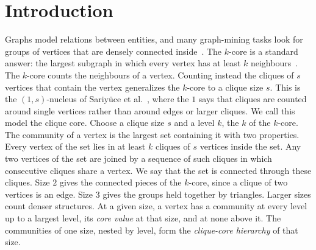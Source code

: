 \section{Introduction}\label{sec:intro}

Graphs model relations between entities, and many graph-mining tasks look for groups of vertices that are densely connected inside~\cite{leskovec2016snap,fortunato2010community,Fang2020Survey}.
%
The $k$-core is a standard answer: the largest subgraph in which every vertex has at least $k$ neighbours~\cite{seidman1983network}.
%
The $k$-core counts the neighbours of a vertex.
%
Counting instead the cliques of $s$ vertices that contain the vertex generalizes the $k$-core to a clique size $s$.
%
This is the $(1,s)$-nucleus of Sariy\"uce et al.~\cite{firstNucleus}, where the $1$ says that cliques are counted around single vertices rather than around edges or larger cliques.
%
We call this model the clique core.
%
Choose a clique size $s$ and a level $k$, the $k$ of the $k$-core.
%
The community of a vertex is the largest set containing it with two properties.
%
Every vertex of the set lies in at least $k$ cliques of $s$ vertices inside the set.
%
Any two vertices of the set are joined by a sequence of such cliques in which consecutive cliques share a vertex.
%
We say that the set is connected through these cliques.
%
Size $2$ gives the connected pieces of the $k$-core, since a clique of two vertices is an edge.
%
Size $3$ gives the groups held together by triangles.
%
Larger sizes count denser structures.
%
At a given size, a vertex has a community at every level up to a largest level, its \emph{core value} at that size, and at none above it.
%
The communities of one size, nested by level, form the \emph{clique-core hierarchy} of that size.

